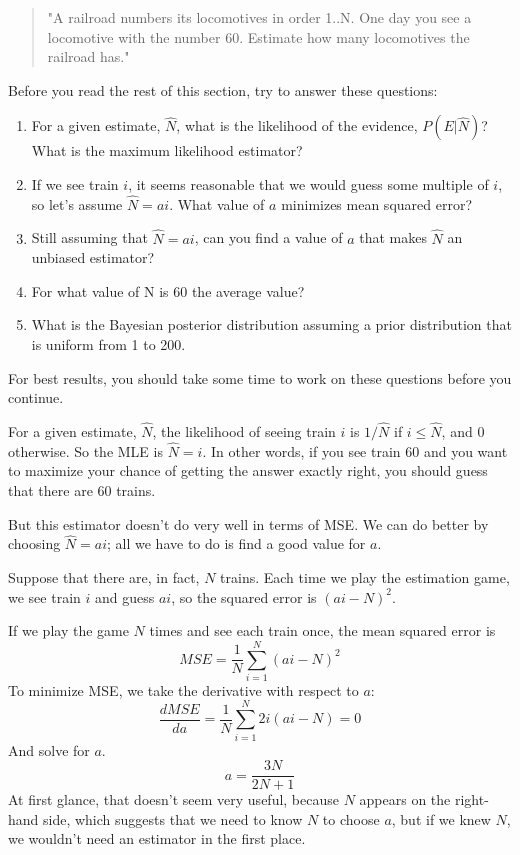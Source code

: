 \documentclass[12pt]{book}
\begin{document}
\begin{quote}
"A railroad numbers its locomotives in order 1..N.  One day you see a
locomotive with the number 60.  Estimate how many locomotives the
railroad has."
\end{quote}

Before you read the rest of this section, try to answer these
questions:

\newcommand{\nhat}{\hat{N}}

\begin{enumerate}

\item For a given estimate, $\nhat$, what is the likelihood of the
  evidence, $P(E|\nhat)$?  What is the maximum likelihood estimator?

\item If we see train $i$, it seems reasonable that we would guess
  some multiple of $i$, so let's assume $\nhat = a i$.  What value of
  $a$ minimizes mean squared error?

\item Still assuming that $\nhat = a i$, can you find a value of $a$
  that makes $\nhat$ an unbiased estimator?

\item For what value of N is 60 the average value?

\item What is the Bayesian posterior distribution assuming a prior
distribution that is uniform from 1 to 200.

\end{enumerate}

For best results, you should take some time to work on these questions
before you continue.

For a given estimate, $\nhat$, the likelihood of seeing train $i$ is
$1 / \nhat$ if $i \le \nhat$, and 0 otherwise.  So the MLE is $\nhat =
i$.  In other words, if you see train 60 and you want to maximize your
chance of getting the answer exactly right, you should guess that there
are 60 trains.

But this estimator doesn't do very well in terms of MSE.  We can do
better by choosing $\nhat = a i$; all we have to do is find a good
value for $a$.

Suppose that there are, in fact, $N$ trains.  Each time we play
the estimation game, we see train $i$ and guess $ai$, so the squared
error is $(ai - N)^2$.

If we play the game $N$ times and see each train once, the mean
squared error is 
%
\[ MSE = \frac{1}{N} \sum_{i=1}^N (ai - N)^2 \]
%
To minimize MSE, we take the derivative with respect to $a$:
%
\[ \frac{d MSE}{da} = \frac{1}{N} \sum_{i=1}^N 2i (ai - N) = 0 \]
%
And solve for $a$.
%
\[ a = \frac{3N}{2N+1} \]
%
At first glance, that doesn't seem very useful, because $N$ appears on
the right-hand side, which suggests that we need to know $N$ to choose
$a$, but if we knew $N$, we wouldn't need an estimator in the first place.
\end{document}
